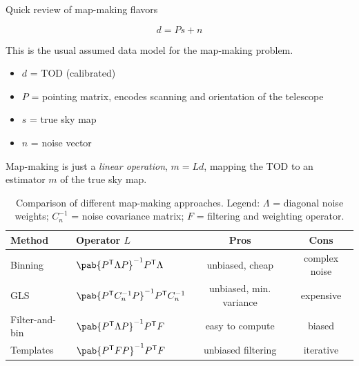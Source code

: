 \documentclass[final]{beamer}
\newcommand{\transpose}[1]{\ensuremath{#1^{\mathsf T}}}
\newlength{\colwidth}
\begin{document}
\begin{frame}[t]
\begin{columns}[t]
\begin{column}{\colwidth}
\begin{alertblock}{Quick review of map-making flavors}

        \begin{equation}\label{eq:data_model}
          d = P s + n
        \end{equation}

        This is the usual assumed data model for the map-making problem.

        \begin{itemize}
          \item $d$ = TOD (calibrated)
          \item $P$ = pointing matrix, encodes scanning and orientation of the telescope
          \item $s$ = true sky map
          \item $n$ = noise vector
        \end{itemize}

        Map-making is just a \emph{linear operation}, $m = Ld$, mapping the TOD to an estimator $m$ of the true sky map.

        \begin{table}
          \centering
          \begin{tabular}{l l c c}
            \toprule
            \textbf{Method} & \textbf{Operator} $L$                                            & \textbf{Pros}           & \textbf{Cons} \\
            \midrule
            Binning         & \( \pab{\transpose{P} \Lambda P}^{-1} \transpose{P} \Lambda \)   & unbiased, cheap         & complex noise \\
            \midrule
            GLS             & \( \pab{\transpose{P} C_n^{-1} P}^{-1} \transpose{P} C_n^{-1} \) & unbiased, min. variance & expensive     \\
            \midrule
            Filter-and-bin  & \( \pab{\transpose{P} {\Lambda P}}^{-1} \transpose{P} F \)       & easy to compute         & biased        \\
            \midrule
            Templates       & \( \pab{\transpose{P} F P}^{-1} \transpose{P} F \)               & unbiased filtering      & iterative     \\
            \bottomrule
          \end{tabular}
          \caption{Comparison of different map-making approaches. Legend: $\Lambda$ = diagonal noise weights; $C_n^{-1}$ = noise covariance matrix; $F$ = filtering and weighting operator.}
        \end{table}


\end{alertblock}
\end{column}
\end{columns}
\end{frame}
\end{document}

